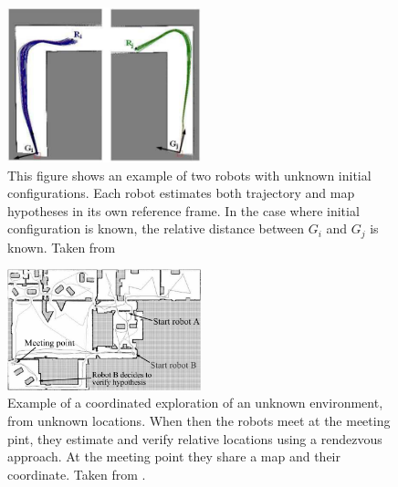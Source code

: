 \begin{figure}[H]
    \centering
    \includegraphics[width=0.5\textwidth]{figs/initial_configuration_example.png}
    \caption[Two relative robot maps]{This figure shows an example of two robots with unknown initial configurations. Each robot estimates both trajectory and map hypotheses in its own reference frame. In the case where initial configuration is known, the relative distance between $G_i$ and $G_j$ is known. Taken from \cite{Carlone2010a} }
    \label{fig:initial}
\end{figure}

\begin{figure}[H]
    \centering
    \includegraphics[width=0.5\textwidth]{figs/rendezvous_example.png}
    \caption[Example of coordinated exploration]{Example of a coordinated exploration of an unknown environment, from unknown locations. When then the robots meet at the meeting pint, they estimate and verify relative locations using a rendezvous approach. At the meeting point they share a map and their coordinate. Taken from \cite{Thrun2006}.}
    \label{fig:rendevous}
\end{figure}

